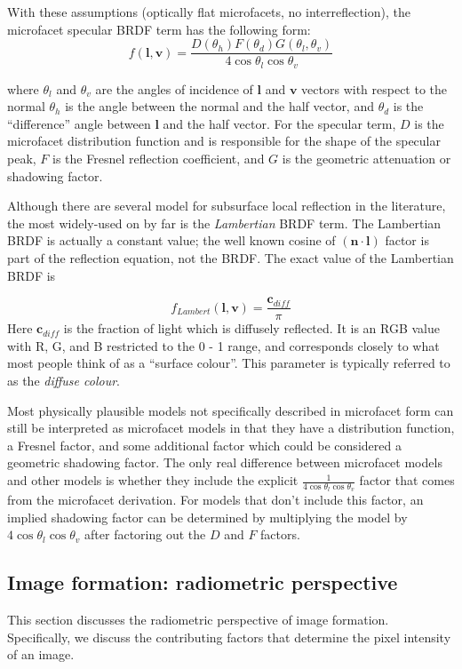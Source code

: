 With these assumptions (optically flat microfacets, no interreflection), the microfacet specular BRDF term has the following form:
$$
f(\mathbf{l}, \mathbf{v}) = \frac{D(\theta_h)F(\theta_d)G(\theta_l, \theta_v)}{4\cos\theta_l\cos\theta_v}
$$

where $\theta_l$ and $\theta_v$ are the angles of incidence of $\mathbf{l}$ and $\mathbf{v}$ vectors with respect to the normal $\theta_h$ is the angle between the normal and the half vector, and $\theta_d$ is the ``difference'' angle between $\mathbf{l}$ and the half vector. For the specular term, $D$ is the microfacet distribution function and is responsible for the shape of the specular peak, $F$ is the Fresnel reflection coefficient, and $G$ is the geometric attenuation or shadowing factor. 

Although there are several model for subsurface local reflection in the literature, the most widely-used on by far is the \textit{Lambertian} BRDF term. The Lambertian BRDF is actually a constant value; the well known cosine of $(\mathbf{n}\cdot\mathbf{l})$ factor is part of the reflection equation, not the BRDF. The exact value of the Lambertian BRDF is

$$
f_{Lambert}(\mathbf{l}, \mathbf{v}) = \frac{\mathbf{c}_{diff}}{\pi}
$$
Here $\mathbf{c}_{diff}$ is the fraction of light which is diffusely reflected. It is an RGB value with R, G, and B restricted to the 0 - 1 range, and corresponds closely to what most people think of as a ``surface colour''. This parameter is typically referred to as the \textit{diffuse colour}.

Most physically plausible models not specifically described in microfacet form can still be interpreted as microfacet models in that they have a distribution function, a Fresnel factor, and some additional factor which could be considered a geometric shadowing factor. The only real difference
between microfacet models and other models is whether they include the explicit $\frac{1}{4\cos\theta_l\cos\theta_v}$ factor that comes from the microfacet derivation. For models that don’t include this factor, an implied shadowing factor can be determined by multiplying the model by $4\cos\theta_l\cos\theta_v$ after factoring out the $D$ and $F$ factors.

\subsection{Image formation: radiometric perspective}
This section discusses the radiometric perspective of image formation. Specifically, we discuss the contributing factors that determine the pixel intensity of an image.

